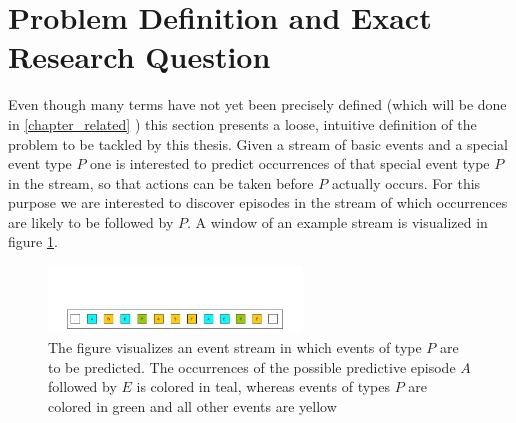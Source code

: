 \section{Problem Definition and Exact Research Question}
Even though many terms have not yet been precisely defined (which will be done in \ref{chapter_related} ) this section presents a loose, intuitive definition of the problem to be tackled by this thesis. Given a stream of basic events and a special event type $P$ one is interested to predict occurrences of that special event type $P$ in the stream, so that actions can be taken before $P$ actually occurs. For this purpose we are interested to discover episodes in the stream of which occurrences are likely to be followed by $P$. A window of an example stream is visualized in figure \ref{fig_predictiveEpisodeExample}.

\begin{figure}[h]
	\centering
  	\includegraphics[width=0.6\textwidth]{examplePrediction.jpg}
	\caption{The figure visualizes an event stream in which events of type $P$ are to be predicted. The occurrences of the possible predictive episode $A$ followed by $E$ is colored in teal, whereas events of types $P$ are colored in green and all other events are yellow}
	\label{fig_predictiveEpisodeExample}
\end{figure}

